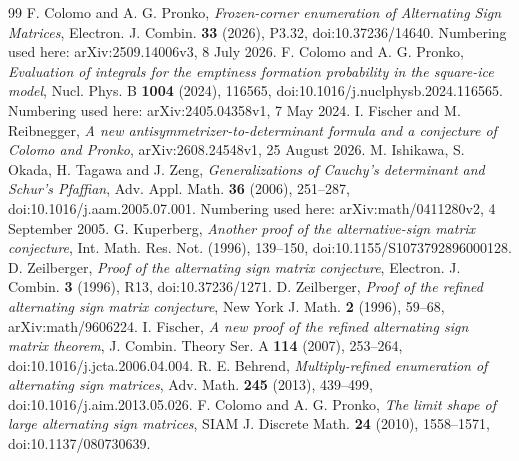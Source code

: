 \documentclass[11pt,a4paper]{amsart}
\newcommand{\href}[2]{#2}
\theoremstyle{remark}\newtheorem{remark}[theorem]{Remark}
\numberwithin{equation}{section}
\begin{document}
\clearpage
\begin{thebibliography}{99}
 F. Colomo and A. G. Pronko, \emph{Frozen-corner enumeration of Alternating Sign Matrices}, Electron. J. Combin. \textbf{33} (2026), P3.32, \href{https://doi.org/10.37236/14640}{doi:10.37236/14640}. Numbering used here: \href{https://arxiv.org/abs/2509.14006v3}{arXiv:2509.14006v3}, 8 July 2026.
 F. Colomo and A. G. Pronko, \emph{Evaluation of integrals for the emptiness formation probability in the square-ice model}, Nucl. Phys. B \textbf{1004} (2024), 116565, \href{https://doi.org/10.1016/j.nuclphysb.2024.116565}{doi:10.1016/j.nuclphysb.2024.116565}. Numbering used here: \href{https://arxiv.org/abs/2405.04358v1}{arXiv:2405.04358v1}, 7 May 2024.
 I. Fischer and M. Reibnegger, \emph{A new antisymmetrizer-to-determinant formula and a conjecture of Colomo and Pronko}, \href{https://arxiv.org/abs/2608.24548v1}{arXiv:2608.24548v1}, 25 August 2026.
 M. Ishikawa, S. Okada, H. Tagawa and J. Zeng, \emph{Generalizations of Cauchy's determinant and Schur's Pfaffian}, Adv. Appl. Math. \textbf{36} (2006), 251--287, \href{https://doi.org/10.1016/j.aam.2005.07.001}{doi:10.1016/j.aam.2005.07.001}. Numbering used here: \href{https://arxiv.org/abs/math/0411280v2}{arXiv:math/0411280v2}, 4 September 2005.
 G. Kuperberg, \emph{Another proof of the alternative-sign matrix conjecture}, Int. Math. Res. Not. (1996), 139--150, \href{https://doi.org/10.1155/S1073792896000128}{doi:10.1155/S1073792896000128}.
 D. Zeilberger, \emph{Proof of the alternating sign matrix conjecture}, Electron. J. Combin. \textbf{3} (1996), R13, \href{https://doi.org/10.37236/1271}{doi:10.37236/1271}.
 D. Zeilberger, \emph{Proof of the refined alternating sign matrix conjecture}, New York J. Math. \textbf{2} (1996), 59--68, \href{https://arxiv.org/abs/math/9606224}{arXiv:math/9606224}.
 I. Fischer, \emph{A new proof of the refined alternating sign matrix theorem}, J. Combin. Theory Ser. A \textbf{114} (2007), 253--264, \href{https://doi.org/10.1016/j.jcta.2006.04.004}{doi:10.1016/j.jcta.2006.04.004}.
 R. E. Behrend, \emph{Multiply-refined enumeration of alternating sign matrices}, Adv. Math. \textbf{245} (2013), 439--499, \href{https://doi.org/10.1016/j.aim.2013.05.026}{doi:10.1016/j.aim.2013.05.026}.
 F. Colomo and A. G. Pronko, \emph{The limit shape of large alternating sign matrices}, SIAM J. Discrete Math. \textbf{24} (2010), 1558--1571, \href{https://doi.org/10.1137/080730639}{doi:10.1137/080730639}.

\end{thebibliography}
\end{document}
